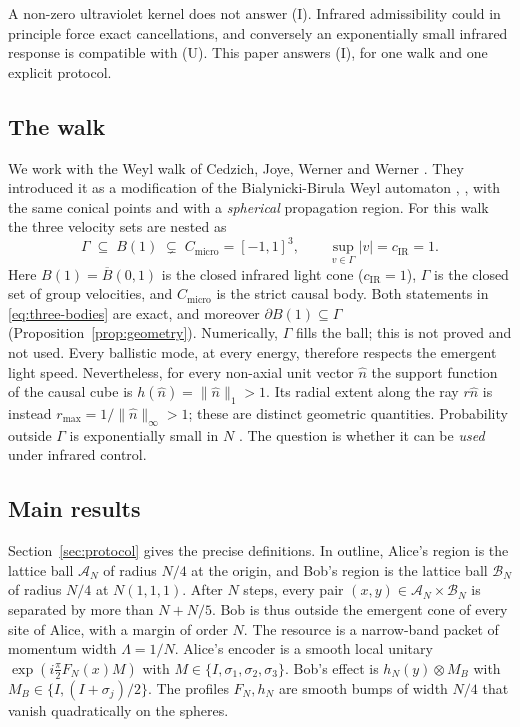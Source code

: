 \documentclass[11pt]{amsart}
\theoremstyle{definition}
\theoremstyle{remark}
\newcommand{\cA}{\mathcal{A}}
\newcommand{\cB}{\mathcal{B}}
\newcommand{\Cmicro}{C_{\mathrm{micro}}}
\newcommand{\cIR}{c_{\mathrm{IR}}}
\begin{document}
A non-zero ultraviolet kernel does not answer (I).  Infrared admissibility
could in principle force exact cancellations, and conversely an exponentially
small infrared response is compatible with (U).  This paper answers (I), for
one walk and one explicit protocol.

\subsection*{The walk}
We work with the Weyl walk of Cedzich, Joye, Werner and Werner
\cite[Eq.~(5.15)]{CJWW}.  They introduced it as a modification of the
Bialynicki-Birula Weyl automaton \cite[Eq.~(5.12)]{CJWW},
\cite{BialynickiBirula}, with the same conical points and with a
\emph{spherical} propagation region.  For this walk the three velocity sets
are nested as
\begin{equation}\label{eq:three-bodies}
\Gamma\;\subseteq\;B(1)\;\subsetneq\;\Cmicro=[-1,1]^3,
\qquad \sup_{v\in\Gamma}|v|=\cIR=1 .
\end{equation}
Here $B(1)=\overline B(0,1)$ is the closed infrared light cone ($\cIR=1$),
$\Gamma$ is the closed set of group velocities, and $\Cmicro$ is the strict
causal body.  Both statements in \eqref{eq:three-bodies} are exact, and
moreover $\partial B(1)\subseteq\Gamma$ (Proposition~\ref{prop:geometry}).
Numerically, $\Gamma$ fills the ball; this is not proved and not used.
Every ballistic mode, at every energy, therefore respects the emergent light
speed.  Nevertheless, for every non-axial unit vector $\hat n$ the support
function of the causal cube is $h(\hat n)=\|\hat n\|_1>1$.
Its radial extent along the ray $r\hat n$ is instead
$r_{\max}=1/\|\hat n\|_\infty>1$; these are distinct geometric quantities.
Probability outside $\Gamma$ is exponentially small in $N$ \cite{CJWW}.  The
question is whether it can be \emph{used} under infrared control.

\subsection*{Main results}
Section~\ref{sec:protocol} gives the precise definitions.  In outline,
Alice's region is the lattice ball $\cA_N$ of radius $N/4$ at the origin,
and Bob's region is the lattice ball $\cB_N$ of radius $N/4$ at $N(1,1,1)$.
After $N$ steps, every pair $(x,y)\in\cA_N\times\cB_N$ is separated by more
than $N+N/5$.  Bob is thus outside the emergent cone of every site of
Alice, with a margin of order $N$.  The resource is a narrow-band packet of
momentum width $\Lambda=1/N$.  Alice's encoder is a smooth local unitary
$\exp(i\frac\pi2F_N(x)M)$ with $M\in\{I,\sigma_1,\sigma_2,\sigma_3\}$.  Bob's
effect is $h_N(y)\otimes M_B$ with $M_B\in\{I,(I+\sigma_j)/2\}$.  The
profiles $F_N,h_N$ are smooth bumps of width $N/4$ that vanish quadratically
on the spheres.
\end{document}
